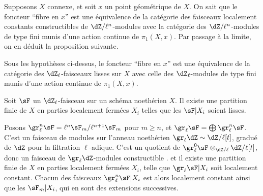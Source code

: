 Supposons $X$ connexe, et soit $x$ un point géométrique de $X$. On sait que 
le foncteur ``fibre en $x$'' est une équivalence de la catégorie des 
faisceaux localement constants constructibles de $\dZ/\ell^n$-modules avec la 
catégorie des $\dZ/\ell^n$-modules de type fini munis d'une action continue 
de $\pi_1(X,x)$. Par passage à la limite, on en déduit la proposition 
suivante. 





\begin{proposition_}\label{II:2-4}
Sous les hypothèses ci-dessus, le foncteur ``fibre en $x$'' est une 
équivalence de la catégorie des $\dZ_\ell$-faisceaux lisses sur $X$ avec 
celle des $\dZ_\ell$-modules de type fini munis d'une action continue de 
$\pi_1(X,x)$. 
\end{proposition_}





\begin{proposition_}\label{II:2-5}
Soit $\sF$ un $\dZ_\ell$-faisceau sur un schéma noethérien $X$. Il existe 
une partition finie de $X$ en parties localement fermées $X_i$ telles que 
les $\sF|X_i$ soient lisses.
\end{proposition_}

Posons $\gr_\ell^n\sF=\ell^n\sF_m/\ell^{n+1}\sF_m$ pour $m\geqslant n$, et 
$\gr_\ell\sF=\bigoplus \gr_\ell^n\sF$. C'est un faisceau de modules sur 
l'anneau noethérien $\gr_\ell\dZ\sim\dZ/\ell[t]$, gradué de $\dZ$ pour la 
filtration $\ell$-adique. C'est un quotient de 
$\gr_\ell^0\sF \otimes_{\dZ/\ell} \dZ/\ell[t]$, donc un faisceau de 
$\gr_\ell\dZ$-modules constructible \cite[IX.2]{sga4}. et il existe une partition 
finie de $X$ en parties localement fermées $X_i$, telle que 
$\gr_\ell \sF|X_i$ soit localement constant. Chacun des faisceaux 
$\gr_\ell^n\sF|X_i$ est alors localement constant ainsi que les $\sF_m|X_i$, 
qui en sont des extensions successives. 





\subsection{}\label{II:2-6}

